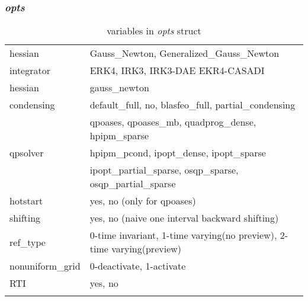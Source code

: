 \documentclass{article}
\newcommand{\alert}[1]{{\textit{#1}}}
\begin{document}
\subsubsection{\alert{opts}}
\begin{longtable}{l|l}
	\hline
		hessian          & Gauss\_Newton, Generalized\_Gauss\_Newton
		\\
		integrator       & ERK4, IRK3, IRK3-DAE EKR4-CASADI                                                                                                                                      \\
		hessian          & gauss\_newton                                                                                                                                                \\
		condensing       & default\_full, no, blasfeo\_full, partial\_condensing                                                                                                        \\ \hline
		\multirow{3}{*}{qpsolver} & qpoases, qpoases\_mb, quadprog\_dense, hpipm\_sparse        \\
		& hpipm\_pcond, ipopt\_dense, ipopt\_sparse                   \\
		& ipopt\_partial\_sparse, osqp\_sparse, osqp\_partial\_sparse \\ \hline
		hotstart         & yes, no (only for qpoases)                                                                                                                                                     \\
		shifting         & yes, no (naive one interval backward shifting)     \\                                                                                                                                                 		                                                                                                                                                     
		ref\_type        & 0-time invariant, 1-time varying(no preview), 2-time varying(preview)                                                                                                                                                     \\
		nonuniform\_grid & 0-deactivate, 1-activate\\ 
		RTI              & yes, no \\ \hline        		
	\caption{variables in \alert{opts} struct}
	\label{table:opts}                                                        
\end{longtable}
\end{document}
